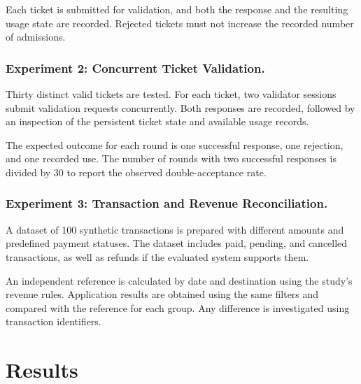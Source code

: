 \documentclass[runningheads]{llncs}
\begin{document}
Each ticket is submitted for validation, and both the response and
the resulting usage state are recorded. Rejected tickets must not
increase the recorded number of admissions.


\subsubsection{Experiment 2: Concurrent Ticket Validation.}

Thirty distinct valid tickets are tested. For each ticket, two
validator sessions submit validation requests concurrently. Both
responses are recorded, followed by an inspection of the persistent
ticket state and available usage records.

The expected outcome for each round is one successful response, one
rejection, and one recorded use. The number of rounds with two
successful responses is divided by 30 to report the observed
double-acceptance rate.


\subsubsection{Experiment 3: Transaction and Revenue Reconciliation.}

A dataset of 100 synthetic transactions is prepared with different
amounts and predefined payment statuses. The dataset includes paid,
pending, and cancelled transactions, as well as refunds if the
evaluated system supports them.

An independent reference is calculated by date and destination using
the study's revenue rules. Application results are obtained using the
same filters and compared with the reference for each group. Any
difference is investigated using transaction identifiers.


\section{Results}
\end{document}
